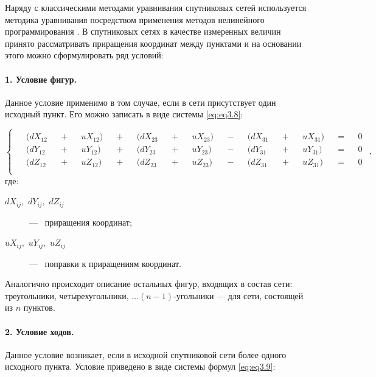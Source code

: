 Наряду с классическими методами уравнивания спутниковых сетей используется методика уравнивания посредством применения методов нелинейного программирования \cite{src14,src16}. В спутниковых сетях в качестве измеренных величин принято рассматривать приращения координат между пунктами и на основании этого можно сформулировать ряд условий:

\paragraph{1. Условие фигур.}\label{Условие_Фигур}


Данное условие применимо в том случае, если в сети присутствует один исходный пункт. Его можно записать в виде системы \cref{eq:eq3.8}:

\begin{equation}\label{eq:eq3.8}
\!
\begin{cases}
\begin{aligned}
	&(dX_{12} &&+ &&uX_{12}) &&+ &&(dX_{23} &&+ &&uX_{23}) &&- &&(dX_{31} &&+ &&uX_{31}) &&= &&0 \\
	&(dY_{12} &&+ &&uY_{12}) &&+ &&(dY_{23} &&+ &&uY_{23}) &&- &&(dY_{31} &&+ &&uY_{31}) &&= &&0 \\
	&(dZ_{12} &&+ &&uZ_{12}) &&+ &&(dZ_{23} &&+ &&uZ_{23}) &&- &&(dZ_{31} &&+ &&uZ_{31}) &&= &&0 \\
\end{aligned}
\end{cases},
\end{equation}
где: 
\begin{description}
	\item[$dX_{ij},$ $dY_{ij},$ $dZ_{ij}$] ---~ приращения координат; 
	\item[$uX_{ij},$ $uY_{ij},$ $uZ_{ij}$] ---~ поправки к приращениям координат.
\end{description}

Аналогично происходит описание остальных фигур, входящих в состав сети: треугольники, четырехугольники, $\ldots (n-1)$-угольники –-- для сети, состоящей из $n$ пунктов.



\paragraph{2. Условие ходов.}\label{Условие_Ходов}


Данное условие возникает, если в исходной спутниковой сети более одного исходного пункта. 
Условие приведено в виде системы формул \cref{eq:eq3.9}:


